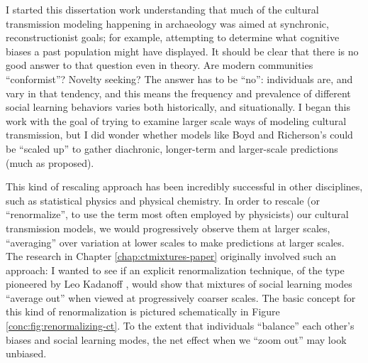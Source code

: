 I started this dissertation work understanding that much of the cultural transmission modeling happening in archaeology was aimed at synchronic, reconstructionist goals; for example, attempting to determine what cognitive biases a past population might have displayed.  It should be clear that there is no good answer to that question even in theory.  Are modern communities ``conformist''?  Novelty seeking?  The answer has to be ``no'':  individuals are, and vary in that tendency, and this means the frequency and prevalence of different social learning behaviors varies both historically, and situationally.  I began this work with the goal of trying to examine larger scale ways of modeling cultural transmission, but I did wonder whether models like Boyd and Richerson's could be ``scaled up'' to gather diachronic, longer-term and larger-scale predictions (much as \citealt{Kandler2013} proposed).  

This kind of rescaling approach has been incredibly successful in other disciplines, such as statistical physics and physical chemistry.  In order to rescale (or ``renormalize'', to use the term most often employed by physicists) our cultural transmission models, we would progressively observe them at larger scales, ``averaging'' over variation at lower scales to make predictions at larger scales.  The research in Chapter \ref{chap:ctmixtures-paper} originally involved such an approach:  I wanted to see if an explicit renormalization technique, of the type pioneered by Leo Kadanoff \citeyearpar{kadanoff1966scaling,Kadanoff2000}, would show that mixtures of social learning modes ``average out'' when viewed at progressively coarser scales.  The basic concept for this kind of renormalization is pictured schematically in Figure \ref{conc:fig:renormalizing-ct}.  To the extent that individuals ``balance'' each other's biases and social learning modes, the net effect when we ``zoom out'' may look unbiased.

